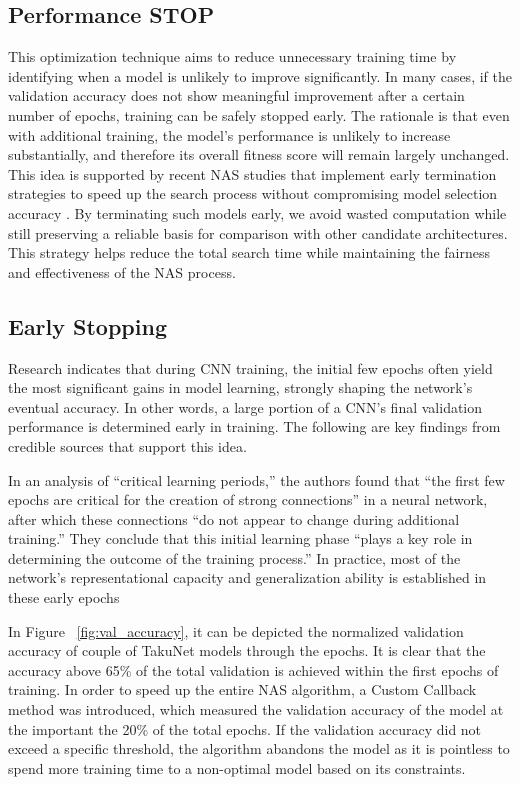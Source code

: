 \subsection{Performance STOP}
This optimization technique aims to reduce unnecessary training time by identifying when a model is unlikely to improve significantly. In many cases, if the validation accuracy does not show meaningful improvement after a certain number of epochs, training can be safely stopped early. The rationale is that even with additional training, the model’s performance is unlikely to increase substantially, and therefore its overall fitness score will remain largely unchanged. This idea is supported by recent NAS studies that implement early termination strategies to speed up the search process without compromising model selection accuracy \cite{li2020random}. By terminating such models early, we avoid wasted computation while still preserving a reliable basis for comparison with other candidate architectures. This strategy helps reduce the total search time while maintaining the fairness and effectiveness of the NAS process.

\subsection{Early Stopping}

Research indicates that during CNN training, the initial few epochs often yield the most significant gains in model learning, strongly shaping the network’s eventual accuracy. In other words, a large portion of a CNN’s final validation performance is determined early in training. The following are key findings from credible sources that support this idea.

In an analysis of “critical learning periods,” the authors found that “the first few epochs are critical for the creation of strong connections” in a neural network, after which these connections “do not appear to change during additional training.” They conclude that this initial learning phase “plays a key role in determining the outcome of the training process.” In practice, most of the network’s representational capacity and generalization ability is established in these early epochs \cite{achille2017critical}

In Figure ~\ref{fig:val_accuracy}, it can be depicted the normalized validation accuracy of couple of TakuNet models through the epochs. 
It is clear that the accuracy above 65\% of the total validation is achieved within the first epochs of training.
In order to speed up the entire NAS algorithm, a Custom Callback method was introduced, which measured the validation accuracy of the model at the important the 20\% of the total epochs. If the validation accuracy did not exceed a specific threshold, the algorithm abandons the model as it is pointless to spend more training time to a non-optimal model based on its constraints.

